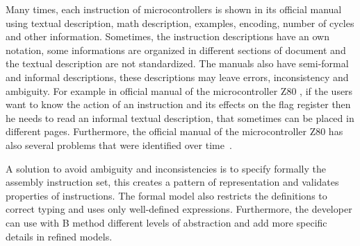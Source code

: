 \documentclass[a4paper]{llncs}
\begin{document}
Many times, each instruction of microcontrollers is shown in its official manual
using textual description, math description, examples, encoding, number of cycles
and other information. Sometimes, the instruction descriptions have
an own notation, some informations are organized in different sections
of document and the textual description are not standardized. 
The manuals also have semi-formal and informal descriptions, these descriptions
may leave errors, inconsistency and ambiguity.  
For example in official manual of the microcontroller Z80 \cite{Z80_manual}, if the users  
want to know the action of an instruction and its effects on the flag register then he needs
to read an informal textual description, that  sometimes can be placed in different pages. 
Furthermore, the official manual of the microcontroller Z80 has also several
problems that were identified over time~\cite{UndocumentedZ80}.

A solution to avoid ambiguity and inconsistencies is to specify
formally the assembly instruction set, this creates a pattern of
representation and validates properties of instructions. The formal
model also restricts the definitions to correct typing and uses only
well-defined expressions. Furthermore, the developer can use with B
method different levels of abstraction and add more specific details
in refined models.
\end{document}
